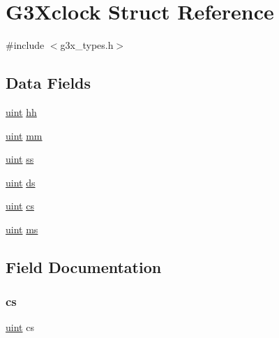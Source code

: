 \hypertarget{struct_g3_xclock}{}\section{G3\+Xclock Struct Reference}
\label{struct_g3_xclock}


{\ttfamily \#include $<$g3x\+\_\+types.\+h$>$}

\subsection*{Data Fields}
\begin{DoxyCompactItemize}
\item 
\hyperlink{g3x__types_8h_a91ad9478d81a7aaf2593e8d9c3d06a14}{uint} \hyperlink{struct_g3_xclock_a4d1ee55639956a3794ee81419b4f5f7a}{hh}
\item 
\hyperlink{g3x__types_8h_a91ad9478d81a7aaf2593e8d9c3d06a14}{uint} \hyperlink{struct_g3_xclock_ab2620c15993ec02d8ae073176ff74f8b}{mm}
\item 
\hyperlink{g3x__types_8h_a91ad9478d81a7aaf2593e8d9c3d06a14}{uint} \hyperlink{struct_g3_xclock_a3f8b4c08b00b9b0cc37cbb88d9f759ca}{ss}
\item 
\hyperlink{g3x__types_8h_a91ad9478d81a7aaf2593e8d9c3d06a14}{uint} \hyperlink{struct_g3_xclock_a101cd9996b0099b01cb6a1594bad1058}{ds}
\item 
\hyperlink{g3x__types_8h_a91ad9478d81a7aaf2593e8d9c3d06a14}{uint} \hyperlink{struct_g3_xclock_a21ff1dca4ee9146feae362cb81bdb73b}{cs}
\item 
\hyperlink{g3x__types_8h_a91ad9478d81a7aaf2593e8d9c3d06a14}{uint} \hyperlink{struct_g3_xclock_a0bcb3d72edad5c1ecf1c931e37128d15}{ms}
\end{DoxyCompactItemize}


\subsection{Field Documentation}
\mbox{\label{struct_g3_xclock_a21ff1dca4ee9146feae362cb81bdb73b}} 
\subsubsection{\texorpdfstring{cs}{cs}}
{\footnotesize\ttfamily \hyperlink{g3x__types_8h_a91ad9478d81a7aaf2593e8d9c3d06a14}{uint} cs}

\mbox{\label{struct_g3_xclock_a101cd9996b0099b01cb6a1594bad1058}} 
